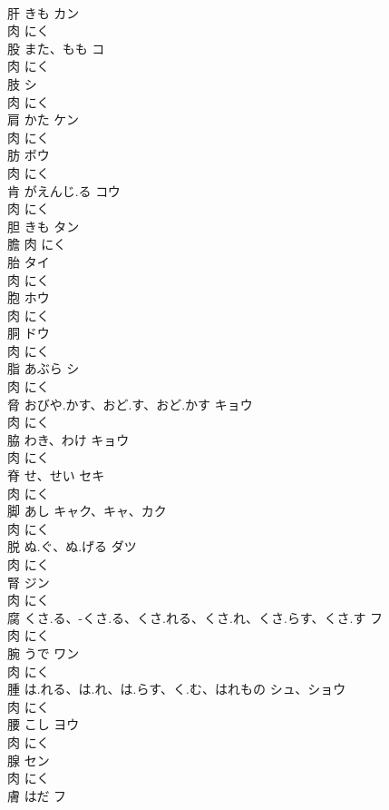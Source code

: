 \documentclass[8pt]{extreport}
\begin{document}
\begin{CJK}{UTF8}{min}
\\	肝	きも	カン	
\\	肉		にく		
\\	股	また、もも	コ	
\\	肉		にく		
\\	肢		シ	
\\	肉		にく		
\\	肩	かた	ケン	
\\	肉		にく		
\\	肪		ボウ	
\\	肉		にく		
\\	肯	がえんじ.る	コウ	
\\	肉		にく		
\\	胆	きも	タン	
\\	膽	肉		にく		
\\	胎		タイ	
\\	肉		にく		
\\	胞		ホウ	
\\	肉		にく		
\\	胴		ドウ	
\\	肉		にく		
\\	脂	あぶら	シ	
\\	肉		にく		
\\	脅	おびや.かす、おど.す、おど.かす	キョウ	
\\	肉		にく		
\\	脇	わき、わけ	キョウ	
\\	肉		にく		
\\	脊	せ、せい	セキ	
\\	肉		にく		
\\	脚	あし	キャク、キャ、カク	
\\	肉		にく		
\\	脱	ぬ.ぐ、ぬ.げる	ダツ	
\\	肉		にく		
\\	腎		ジン	
\\	肉		にく		
\\	腐	くさ.る、-くさ.る、くさ.れる、くさ.れ、くさ.らす、くさ.す	フ	
\\	肉		にく		
\\	腕	うで	ワン	
\\	肉		にく		
\\	腫	は.れる、は.れ、は.らす、く.む、はれもの	シュ、ショウ	
\\	肉		にく		
\\	腰	こし	ヨウ	
\\	肉		にく		
\\	腺		セン	
\\	肉		にく		
\\	膚	はだ	フ	

\end{CJK}
\end{document}
